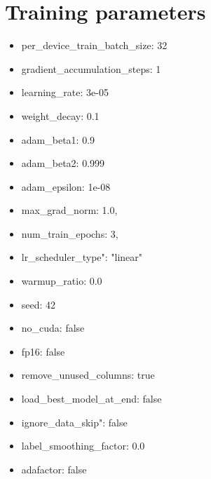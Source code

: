 \chapter{Training parameters}\label{all_parameters}

\begin{itemize}
  \item per\_device\_train\_batch\_size: 32
  \item gradient\_accumulation\_steps: 1
  \item learning\_rate: 3e-05
  \item weight\_decay: 0.1
  \item adam\_beta1: 0.9
  \item adam\_beta2: 0.999
  \item adam\_epsilon: 1e-08
  \item max\_grad\_norm: 1.0,
  \item num\_train\_epochs: 3,
  \item lr\_scheduler\_type": "linear"
  \item warmup\_ratio: 0.0
  \item seed: 42
  \item no\_cuda: false
  \item fp16: false
  \item remove\_unused\_columns: true
  \item load\_best\_model\_at\_end: false
  \item ignore\_data\_skip": false
  \item label\_smoothing\_factor: 0.0
  \item adafactor: false
\end{itemize}
